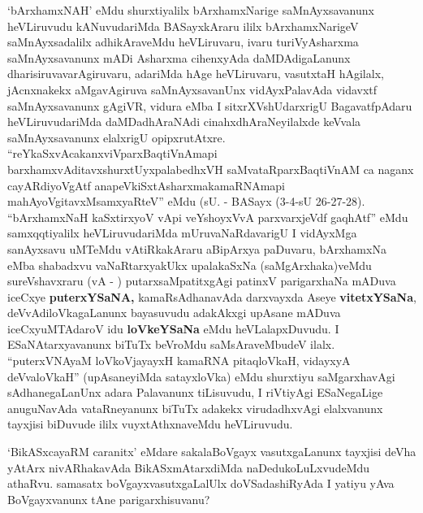 \begin{artha}
`bArxhamxNAH' \mdash  eMdu shurxtiyalilx bArxhamxNarige saMnAyxsavanunx heVLiruvudu kANuvudariMda BASayxkAraru ililx bArxhamxNarigeV saMnAyxsadalilx adhikAraveMdu heVLiruvaru, ivaru turiVyAsharxma saMnAyxsavanunx mADi Asharxma cihenxyAda daMDAdigaLanunx dharisiruvavarAgiruvaru, adariMda hAge heVLiruvaru, vasutxtaH hAgilalx, jAcnxnakekx aMgavAgiruva saMnAyxsavanUnx vidAyxPalavAda vidavxtf saMnAyxsavanunx  gAgiVR, vidura eMba I sitxrXVshUdarxrigU BagavatfpAdaru heVLiruvudariMda daMDadhAraNAdi cinahxdhAraNeyilalxde keVvala saMnAyxsavanunx elalxrigU opipxrutAtxre. ``reYkaSxvAcakanxviVparxBaqtiVnAmapi barxhamxvAditavxshurxtUyxpalabedhxVH saMvataRparxBaqtiVnAM ca naganx cayARdiyoVgAtf anapeVkiSxtAsharxmakamaRNAmapi mahAyoVgitavxMsamxyaRteV'' eMdu (sU. - BASayx (3-4-sU 26-27-28). ``bArxhamxNaH kaSxtirxyoV vApi veYshoyxVvA parxvarxjeVdf gaqhAtf'' eMdu samxqqtiyalilx heVLiruvudariMda mUruvaNaRdavarigU I vidAyxMga sanAyxsavu uMTeMdu vAtiRkakAraru aBipArxya paDuvaru, bArxhamxNa eMba shabadxvu vaNaRtarxyakUkx upalakaSxNa (saMgArxhaka)veMdu sureVshavxraru (vA - ) putarxsaMpatitxgAgi patinxV parigarxhaNa mADuva iceCxye {\bf puterxYSaNA,} kamaRsAdhanavAda darxvayxda Aseye {\bf vitetxYSaNa}, deVvAdiloVkagaLanunx bayasuvudu adakAkxgi upAsane mADuva iceCxyuMTAdaroV idu {\bf loVkeYSaNa} eMdu heVLalapxDuvudu. I ESaNAtarxyavanunx biTuTx beVroMdu saMsAraveMbudeV ilalx. ``puterxVNAyaM loVkoVjayayxH kamaRNA pitaqloVkaH, vidayxyA deVvaloVkaH'' (upAsaneyiMda satayxloVka) eMdu shurxtiyu saMgarxhavAgi sAdhanegaLanUnx adara Palavanunx tiLisuvudu, I riVtiyAgi ESaNegaLige anuguNavAda vataRneyanunx biTuTx adakekx virudadhxvAgi elalxvanunx tayxjisi biDuvude ililx vuyxtAthxnaveMdu heVLiruvudu.
\end{artha}

\begin{artha}
`BikASxcayaRM caranitx' eMdare sakalaBoVgayx vasutxgaLanunx tayxjisi deVha yAtArx nivARhakavAda BikASxmAtarxdiMda naDedukoLuLxvudeMdu athaRvu. samasatx boVgayxvasutxgaLalUlx doVSadashiRyAda I yatiyu yAva BoVgayxvanunx tAne parigarxhisuvanu?
\end{artha}

